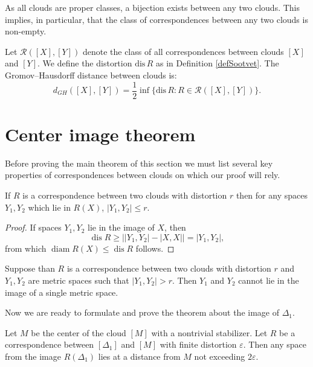 \documentclass[leqno]{article}
\begin{document}
\begin{remark}
As all clouds are proper classes, a bijection exists between any two clouds. This implies, in particular, that the class of correspondences between any two clouds is non-empty.
\end{remark}

\begin{defin}
Let $\mathcal{R}([X],[Y])$ denote the class of all correspondences between clouds $[X]$ and $[Y]$. We define the distortion $\text{dis}\, R$ as in Definition \ref{defSootvet}. The Gromov--Hausdorff distance between clouds is:
$$
d_{GH}([X],[Y]) = \frac{1}{2}\inf\{\text{dis}\, R : R \in \mathcal{R}([X],[Y])\}.
$$
\end{defin}

\section{Center image theorem}

Before proving the main theorem of this section we must list several key properties of correspondences between clouds on which our proof will rely.
\begin{lemma}\label{lemDiamImage}
  If $R$ is a correspondence between two clouds with distortion $r$ then for any spaces $Y_1,Y_2$ which lie in $R(X)$, $|Y_1,Y_2| \le r$.
\end{lemma}

\begin{proof}
If spaces $Y_{1}, Y_{2}$ lie in the image of $X$, then
$$
\operatorname{dis} R \geq \big|\left|Y_{1},Y_{2}\right| - \left|X,X\right|\big| = |Y_{1}, Y_{2}|,
$$
from which $\operatorname{diam} R(X) \leq \operatorname{dis} R$ follows.
\end{proof}

\begin{corollary}
  Suppose than $R$ is a correspondence between two clouds with distortion $r$ and $Y_1,Y_2$ are metric spaces such that $|Y_1,Y_2| > r$. Then $Y_1$ and $Y_2$ cannot lie in the image of a single metric space.
\end{corollary}
Now we are ready to formulate and prove the theorem about the image of $\Delta_1$.
\begin{theorem}\label{thrmCenterImage}
Let $M$ be the center of the cloud $[M]$ with a nontrivial stabilizer. Let $R$ be a correspondence between $[\Delta_{1}]$ and $[M]$ with finite distortion $\varepsilon$. Then any space from the image $R(\Delta_{1})$ lies at a distance from $M$ not exceeding $2\varepsilon$.
\end{theorem}
\end{document}
